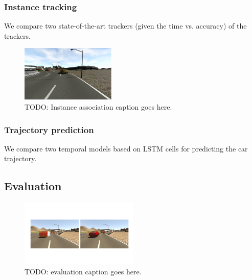 \documentclass[10pt,twocolumn,letterpaper]{article}
\begin{document}
\subsubsection{Instance tracking}

We compare two state-of-the-art trackers (given the time vs. accuracy) of the trackers.
\begin{figure}[t]
        \centering
        \includegraphics[width=0.4\textwidth]{figures/double_detection.png}
        \caption{ {\small TODO: Instance association caption goes here.}}
        \label{fig:Instance_associationn}
\end{figure}

\subsubsection{Trajectory prediction}

We compare two temporal models based on LSTM cells for predicting the car trajectory.



\subsection{Evaluation}
\begin{figure}[t]
        \centering
        \includegraphics[width=0.5\textwidth]{figures/evaluation.pdf}
        \caption{ {\small TODO: evaluation caption goes here.}}
        \label{fig:evaluation}
\end{figure}
\end{document}
